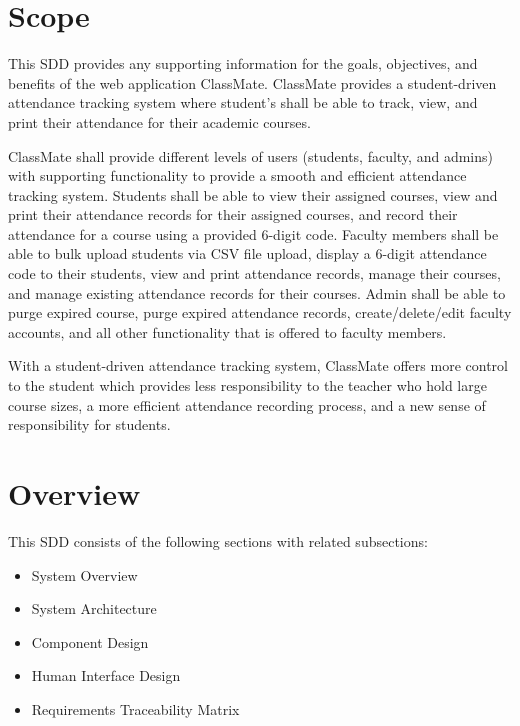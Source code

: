\documentclass[letterpaper,12pt,oneside,listof=totoc]{scrreprt}
\begin{document}
\section{Scope}

This SDD provides any supporting information for the goals, objectives, and benefits of the web application ClassMate. ClassMate provides a student-driven attendance tracking system where student's shall be able to track, view, and print their attendance for their academic courses.

ClassMate shall provide different levels of users (students, faculty, and admins) with supporting functionality to provide a smooth and efficient attendance tracking system. Students shall be able to view their assigned courses, view and print their attendance records for their assigned courses, and record their attendance for a course using a provided 6-digit code. Faculty members shall be able to bulk upload students via CSV file upload, display a 6-digit attendance code to their students, view and print attendance records, manage their courses, and manage existing attendance records for their courses. Admin shall be able to purge expired course, purge expired attendance records, create/delete/edit faculty accounts, and all other functionality that is offered to faculty members.

With a student-driven attendance tracking system, ClassMate offers more control to the student which provides less responsibility to the teacher who hold large course sizes, a more efficient attendance recording process, and a new sense of responsibility for students.

\section{Overview}

This SDD consists of the following sections with related subsections:
\begin{itemize}
    \item System Overview
    \item System Architecture
    \item Component Design
    \item Human Interface Design
    \item Requirements Traceability Matrix
\end{itemize}
\end{document}
